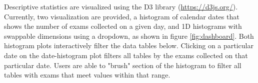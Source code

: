 Descriptive statistics are visualized using the D3 library (\href{https://d3js.org/}{https://d3js.org/}). Currently, two visualization are provided, a histogram of calendar dates that shows the number of exams collected on a given day, and 1D histograms with swappable dimensions using a dropdown, as shown in figure \ref{fig:dashboard}. Both histogram plots interactively filter the data tables below. Clicking on a particular date on the date-histogram plot filters all tables by the exams collected on that particular date. Users are able to "brush" section of the histogram to filter all tables with exams that meet values within that range.  